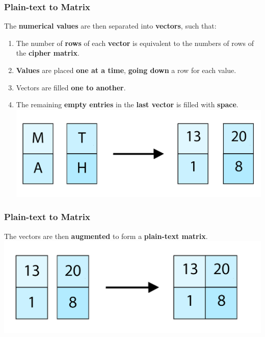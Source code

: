 \documentclass[11pt]{beamer}
\begin{document}
\begin{frame}\frametitle{Plain-text to Matrix}

\small The \textbf{numerical values} are then separated into \textbf{vectors}, such that:\\
\begin{enumerate}[a]

\item \scriptsize The number of \textbf{rows} of each \textbf{vector} is equivalent to the numbers of rows of the \textbf{cipher matrix}. \par
\item \textbf{Values} are placed \textbf{one at a time}, \textbf{going down} a row for each value.
\item Vectors are filled \textbf{one to another}.
\item The remaining \textbf{empty entries} in the \textbf{last vector} is filled with \textbf{space}.
\center \includegraphics[scale=0.2]{math_1}

\end{enumerate}
\end{frame}

\begin{frame}\frametitle{Plain-text to Matrix}

The vectors are then \textbf{augmented} to form a \textbf{plain-text matrix}.
\center \includegraphics[scale=0.2]{MATH}

\end{frame}
\end{document}
